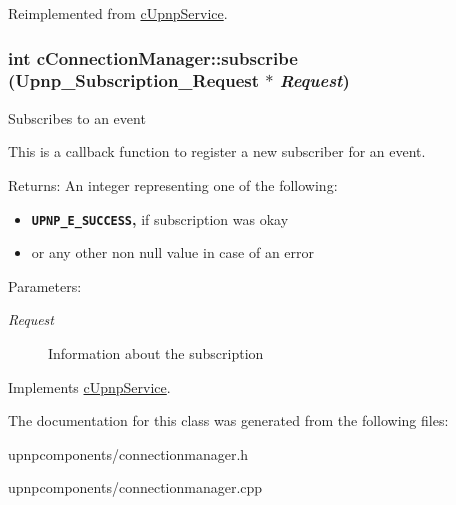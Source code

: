 Reimplemented from \hyperlink{classcUpnpService_f0976057350505eca781aafcaf6b1d14}{cUpnpService}.\hypertarget{classcConnectionManager_7990eba09a100e5e4ee5b01b87bcc16e}{
\subsubsection[{subscribe}]{\setlength{\rightskip}{0pt plus 5cm}int cConnectionManager::subscribe (Upnp\_\-Subscription\_\-Request $\ast$ {\em Request})}}
\label{classcConnectionManager_7990eba09a100e5e4ee5b01b87bcc16e}


Subscribes to an event

This is a callback function to register a new subscriber for an event.

\begin{Desc}
\item[Returns:]An integer representing one of the following:\begin{itemize}
\item {\bf {\tt UPNP\_\-E\_\-SUCCESS},} if subscription was okay\item or any other non null value in case of an error\end{itemize}
\end{Desc}
\begin{Desc}
\item[Parameters:]
\begin{description}
\item[{\em Request}]Information about the subscription \end{description}
\end{Desc}
 

Implements \hyperlink{classcUpnpService_e6d3522d580e5975f5a38d5bea88e29d}{cUpnpService}.

The documentation for this class was generated from the following files:\begin{CompactItemize}
\item 
upnpcomponents/connectionmanager.h\item 
upnpcomponents/connectionmanager.cpp\end{CompactItemize}
